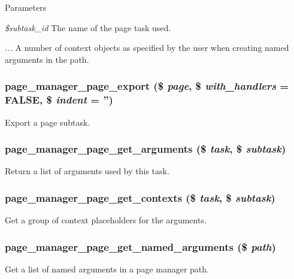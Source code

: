 \begin{DoxyParams}{Parameters}
\item[{\em \$subtask\_\-id}]The name of the page task used. \item[{\em ...}]A number of context objects as specified by the user when creating named arguments in the path. \end{DoxyParams}
\hypertarget{page_8inc_a9ca4e20fa8f4be7150f0e5b4e78695a3}{
\subsubsection[{page\_\-manager\_\-page\_\-export}]{\setlength{\rightskip}{0pt plus 5cm}page\_\-manager\_\-page\_\-export (\$ {\em page}, \/  \$ {\em with\_\-handlers} = {\ttfamily FALSE}, \/  \$ {\em indent} = {\ttfamily ''})}}
\label{page_8inc_a9ca4e20fa8f4be7150f0e5b4e78695a3}
Export a page subtask. \hypertarget{page_8inc_a9a0f9d22ea4e51ed54e624efdd75f5c7}{
\subsubsection[{page\_\-manager\_\-page\_\-get\_\-arguments}]{\setlength{\rightskip}{0pt plus 5cm}page\_\-manager\_\-page\_\-get\_\-arguments (\$ {\em task}, \/  \$ {\em subtask})}}
\label{page_8inc_a9a0f9d22ea4e51ed54e624efdd75f5c7}
Return a list of arguments used by this task. \hypertarget{page_8inc_ad43b368472766e6f474e64ab84f7574e}{
\subsubsection[{page\_\-manager\_\-page\_\-get\_\-contexts}]{\setlength{\rightskip}{0pt plus 5cm}page\_\-manager\_\-page\_\-get\_\-contexts (\$ {\em task}, \/  \$ {\em subtask})}}
\label{page_8inc_ad43b368472766e6f474e64ab84f7574e}
Get a group of context placeholders for the arguments. \hypertarget{page_8inc_a395da60a40abbe79e2a0a92eab2becb9}{
\subsubsection[{page\_\-manager\_\-page\_\-get\_\-named\_\-arguments}]{\setlength{\rightskip}{0pt plus 5cm}page\_\-manager\_\-page\_\-get\_\-named\_\-arguments (\$ {\em path})}}
\label{page_8inc_a395da60a40abbe79e2a0a92eab2becb9}
Get a list of named arguments in a page manager path.



